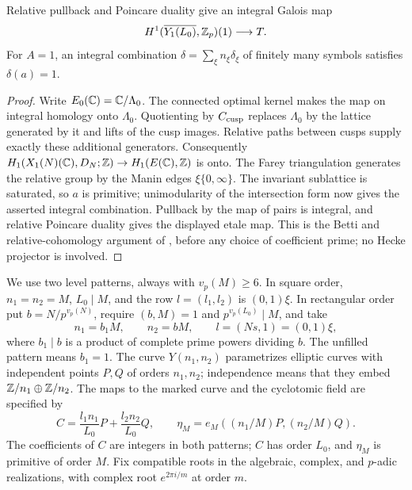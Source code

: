 \begin{lemma}\label{single:relative-lattice}
Relative pullback and Poincare duality give an integral Galois map
\[
 H^1(\overline{Y_1(L_0)},\mathbb Z_p)(1)\longrightarrow T.
\]
For \(A=1\), an integral combination \(\delta=\sum_\xi n_\xi\delta_\xi\)
of finitely many symbols satisfies \(\delta(a)=1\).
\end{lemma}
\begin{proof}
Write \(E_0(\mathbb C)=\mathbb C/\Lambda_0\).  The connected optimal kernel makes
the map on integral homology onto \(\Lambda_0\).  Quotienting by
\(C_{\rm cusp}\) replaces \(\Lambda_0\) by the lattice generated by it
and lifts of the cusp images.  Relative paths between cusps supply
exactly these additional generators.  Consequently
\(H_1(X_1(N)(\mathbb C),D_N;\mathbb Z)\to H_1(E(\mathbb C),\mathbb Z)\) is onto.
The Farey triangulation generates the relative group by the Manin edges
\(\xi\{0,\infty\}\).  The invariant sublattice is saturated, so \(a\)
is primitive; unimodularity of the intersection form now gives the
asserted integral combination.  Pullback by the map of pairs is integral,
and relative Poincare duality gives the displayed etale map.  This is
the Betti and relative-cohomology argument of
\cite[Section~4, ``The integral relative lattice'']{B}, before any choice
of coefficient prime; no Hecke projector is involved.
\end{proof}

We use two level patterns, always with \(v_p(M)\geq6\).
In square order, \(n_1=n_2=M\), \(L_0\mid M\), and the row
\(l=(l_1,l_2)\) is \((0,1)\xi\).
In rectangular order put \(b=N/p^{v_p(N)}\), require
\((b,M)=1\) and \(p^{v_p(L_0)}\mid M\), and take
\[
 n_1=b_1M,\qquad n_2=bM,\qquad l=(Ns,1)=(0,1)\xi,
\]
where \(b_1\mid b\) is a product of complete prime powers dividing \(b\).
The unfilled pattern means \(b_1=1\).
The curve \(Y(n_1,n_2)\) parametrizes elliptic curves with independent
points \(P,Q\) of orders \(n_1,n_2\); independence means that they
embed \(\mathbb Z/n_1\oplus\mathbb Z/n_2\).  The maps to the marked curve and the
cyclotomic field are specified by
\begin{equation}\label{single:mark-root}
 C=\frac{l_1n_1}{L_0}P+\frac{l_2n_2}{L_0}Q,\qquad
 \eta_M=e_M((n_1/M)P,(n_2/M)Q).
\end{equation}
The coefficients of \(C\) are integers in both patterns; \(C\) has
order \(L_0\), and \(\eta_M\) is primitive of order \(M\).
Fix compatible roots in the algebraic, complex, and \(p\)-adic
realizations, with complex root \(e^{2\pi i/m}\) at order \(m\).

